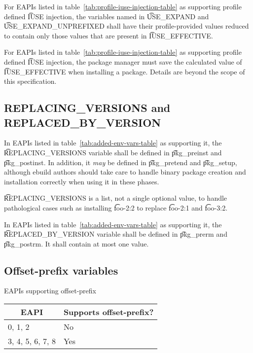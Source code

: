 For EAPIs listed in table~\ref{tab:profile-iuse-injection-table} as supporting profile defined
\t{IUSE} injection, the variables named in \t{USE_EXPAND} and \t{USE_EXPAND_UNPREFIXED} shall
have their profile-provided values reduced to contain only those values that are present in
\t{IUSE_EFFECTIVE}.

For EAPIs listed in table~\ref{tab:profile-iuse-injection-table} as supporting profile defined
\t{IUSE} injection, the package manager must save the calculated value of \t{IUSE_EFFECTIVE} when
installing a package. Details are beyond the scope of this specification.

\subsection{REPLACING_VERSIONS and REPLACED_BY_VERSION}
\label{sec:replacing-versions}

 In EAPIs listed in table~\ref{tab:added-env-vars-table} as
supporting it, the \t{REPLACING_VERSIONS} variable shall be defined in \t{pkg_preinst} and
\t{pkg_postinst}. In addition, it \emph{may} be defined in \t{pkg_pretend} and \t{pkg_setup},
although ebuild authors should take care to handle binary package creation and installation
correctly when using it in these phases.

\t{REPLACING_VERSIONS} is a list, not a single optional value, to handle pathological cases such as
installing \t{foo-2:2} to replace \t{foo-2:1} and \t{foo-3:2}.

In EAPIs listed in table~\ref{tab:added-env-vars-table} as supporting it, the
\t{REPLACED_BY_VERSION} variable shall be defined in \t{pkg_prerm} and \t{pkg_postrm}. It shall
contain at most one value.

\subsection{Offset-prefix variables}
\label{sec:offset-vars}

\begin{centertable}{EAPIs supporting offset-prefix}
    \label{tab:offset-support-table}
    \begin{tabular}{ll}
      \toprule
      \multicolumn{1}{c}{\textbf{EAPI}} &
      \multicolumn{1}{c}{\textbf{Supports offset-prefix?}}\\
      \midrule
      0, 1, 2           & No  \\
      3, 4, 5, 6, 7, 8  & Yes \\
      \bottomrule
    \end{tabular}
\end{centertable}

